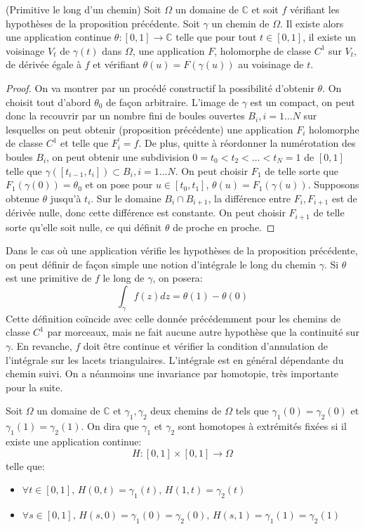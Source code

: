 \begin{fprop}(Primitive le long d'un chemin)
Soit $\Omega$ un domaine de $\mathbb{C}$ et soit $f$ vérifiant les hypothèses
de la proposition précédente. Soit $\gamma$ un chemin de $\Omega$. Il existe
alors une application continue $\theta \colon [0,1] \to \mathbb{C}$ telle 
que pour tout $t \in [0,1]$, il existe un voisinage $V_t$ de $\gamma(t)$
dans $\Omega$, une application $F$, holomorphe de classe $C^1$ sur $V_t$, de
dérivée égale à $f$ et vérifiant $\theta(u)=F(\gamma(u))$ au voisinage de $t$.
\end{fprop}

\begin{proof}
On va montrer par un procédé constructif la possibilité d'obtenir $\theta$. On
choisit tout d'abord $\theta_0$ de façon arbitraire. L'image de $\gamma$ est
un compact, on peut donc la recouvrir par un nombre fini de boules ouvertes
$B_i, i=1\dots N$ sur lesquelles on peut obtenir (proposition
précédente) une application $F_i$ holomorphe de classe $C^1$ et telle que
$F_i^\prime = f$. De plus, quitte à réordonner la numérotation des boules $B_i$,
on peut obtenir une subdivision $0=t_0 < t_2 < \dots < t_N = 1$ de $[0,1]$
telle que $\gamma([t_{i-1},t_i])\subset B_i, i =1\dots N$. 
 On peut choisir $F_1$ de telle sorte que
$F_1(\gamma(0))=\theta_0$ et on pose pour $u \in [t_0,t_1]$,
$\theta(u)=F_1(\gamma(u))$.
Supposons obtenue $\theta$ jusqu'à $t_i$. Sur le domaine $B_i \cap B_{i+1}$, la
différence entre $F_i,F_{i+1}$ est de dérivée nulle, donc cette différence est
constante. On peut choisir $F_{i+1}$ de telle sorte qu'elle soit nulle, ce qui
définit $\theta$ de proche en proche.
\end{proof}
Dans le cas où une application vérifie les hypothèses de la proposition
précédente, on peut définir de façon simple une notion d'intégrale le long du
chemin $\gamma$. Si $\theta$ est une primitive de $f$ le long de $\gamma$, on
posera:
\[
\int_{\gamma} f(z) dz = \theta(1)-\theta(0)
\] 
Cette définition coïncide avec celle donnée précédemment pour les chemins
de classe $C^1$ par morceaux, mais ne fait aucune autre hypothèse que la continuité sur
$\gamma$. En revanche, $f$ doit être continue et vérifier la condition
d'annulation de l'intégrale sur les lacets triangulaires.
L'intégrale est en général dépendante du chemin suivi. On a néanmoins une
invariance par homotopie, très importante pour la suite.
\begin{fdefn}
Soit $\Omega$ un domaine de $\mathbb{C}$ et  $\gamma_1, \gamma_2$ deux
chemins de $\Omega$ tels que $\gamma_1(0) = \gamma_2(0)$ et $\gamma_1(1) = \gamma_2(1)$. On dira que $\gamma_1$ et $\gamma_2$ sont homotopes à extrémités fixées si il existe une application continue:
\[
H \colon [0,1] \times [0,1] \to \Omega
\] 
telle que:
\begin{itemize}
\item $\forall t \in [0,1], \, H(0,t) = \gamma_1(t), \, H(1,t) = \gamma_2(t)$
\item $\forall s \in [0,1], \, H(s,0) = \gamma_1(0) = \gamma_2(0), \, H(s,1) = \gamma_1(1) = \gamma_2(1)$
\end{itemize}
\end{fdefn}

